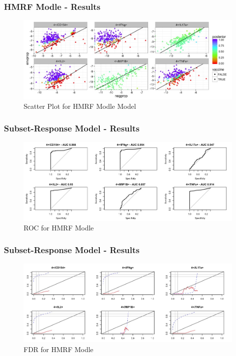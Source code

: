\documentclass{beamer}
\theoremstyle{definition}
\begin{document}

\begin{frame}
\frametitle{HMRF Modle - Results}
\begin{figure}[]
\includegraphics[width=12 cm]{figures/subsetBinomialScatter} \caption{Scatter Plot for HMRF Modle Model}
\end{figure}
\end{frame}

\begin{frame}
\frametitle{Subset-Response Model - Results}
\begin{figure}[]
\includegraphics[width=12 cm]{figures/subsetBinomialAUC} \caption{ROC for HMRF Modle}
\end{figure}
\end{frame}


\begin{frame}
\frametitle{Subset-Response Model - Results}
\begin{figure}[]
\includegraphics[width=12 cm]{figures/subsetBinomialFDR} \caption{FDR for HMRF Modle}
\end{figure}
\end{frame}
\end{document}
